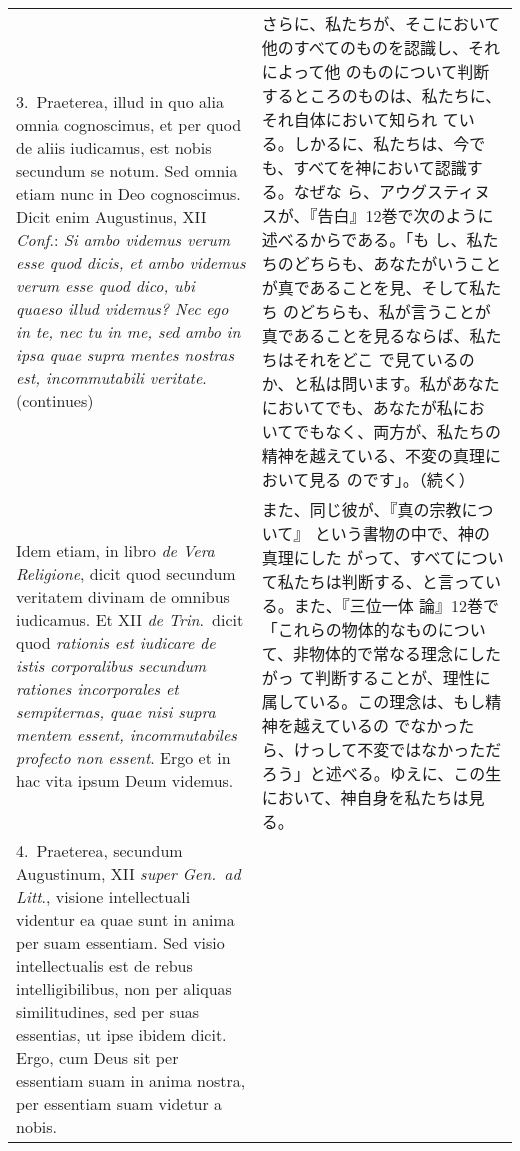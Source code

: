 \documentclass[10pt]{jsarticle} %
\begin{document}
\begin{longtable}{p{21em}p{21em}}
3.~{\sc Praeterea}, illud in quo alia omnia cognoscimus, et per quod
de aliis iudicamus, est nobis secundum se notum. Sed omnia etiam nunc
in Deo cognoscimus. Dicit enim Augustinus, XII {\it Conf}.: {\it Si
ambo videmus verum esse quod dicis, et ambo videmus verum esse quod
dico, ubi quaeso illud videmus? Nec ego in te, nec tu in me, sed ambo
in ipsa quae supra mentes nostras est, incommutabili
veritate}. (continues)

&

さらに、私たちが、そこにおいて他のすべてのものを認識し、それによって他
のものについて判断するところのものは、私たちに、それ自体において知られ
ている。しかるに、私たちは、今でも、すべてを神において認識する。なぜな
ら、アウグスティヌスが、『告白』12巻で次のように述べるからである。「も
し、私たちのどちらも、あなたがいうことが真であることを見、そして私たち
のどちらも、私が言うことが真であることを見るならば、私たちはそれをどこ
で見ているのか、と私は問います。私があなたにおいてでも、あなたが私にお
いてでもなく、両方が、私たちの精神を越えている、不変の真理において見る
のです」。（続く）

\\

Idem etiam, in libro {\it de Vera Religione}, dicit quod secundum
veritatem divinam de omnibus iudicamus. Et XII {\it de Trin}.~dicit
quod {\it rationis est iudicare de istis corporalibus secundum
rationes incorporales et sempiternas, quae nisi supra mentem essent,
incommutabiles profecto non essent}. Ergo et in hac vita ipsum Deum
videmus.

&

また、同じ彼が、『真の宗教について』 という書物の中で、神の真理にした
がって、すべてについて私たちは判断する、と言っている。また、『三位一体
論』12巻で「これらの物体的なものについて、非物体的で常なる理念にしたがっ
て判断することが、理性に属している。この理念は、もし精神を越えているの
でなかったら、けっして不変ではなかっただろう」と述べる。ゆえに、この生
において、神自身を私たちは見る。

\\

4.~{\sc Praeterea}, secundum Augustinum, XII {\it super Gen.~ad
Litt}., visione intellectuali videntur ea quae sunt in anima per suam
essentiam. Sed visio intellectualis est de rebus intelligibilibus, non
per aliquas similitudines, sed per suas essentias, ut ipse ibidem
dicit. Ergo, cum Deus sit per essentiam suam in anima nostra, per
essentiam suam videtur a nobis.

&


\end{longtable}
\end{document}
